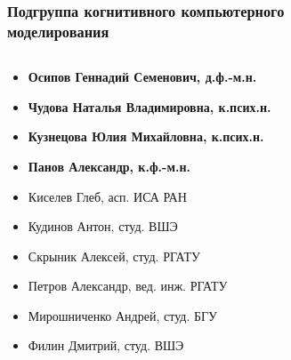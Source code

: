 \documentclass[default]{beamer}
\begin{document}
	\begin{frame}
		\frametitle{Подгруппа когнитивного компьютерного\\моделирования}
		\small
		\begin{columns}
			\begin{column}{0.65\textwidth}
				\begin{itemize}
					\item \textbf{Осипов Геннадий Семенович, д.ф.-м.н.}
					\item \textbf{Чудова Наталья Владимировна, к.псих.н.}
					\item \textbf{Кузнецова Юлия Михайловна, к.псих.н.}
					\item \textbf{Панов Александр, к.ф.-м.н.}
					\item Киселев Глеб, асп. ИСА РАН
					\item Кудинов Антон, студ. ВШЭ
					\item Скрыник Алексей, студ. РГАТУ
					\item Петров Александр, вед. инж. РГАТУ
					\item Мирошниченко Андрей, студ. БГУ
					\item Филин Дмитрий, студ. ВШЭ
				\end{itemize}
			\end{column}
			\begin{column}{0.35\textwidth}
\end{column}
\end{columns}
\end{frame}
\end{document}
